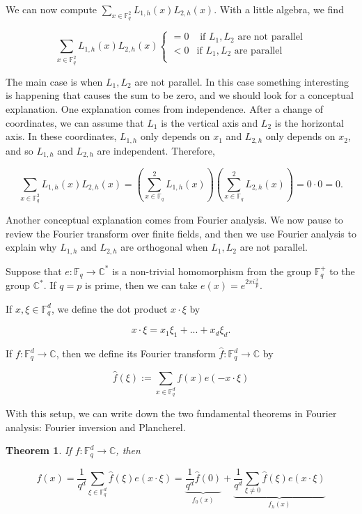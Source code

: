 \documentclass[12pt]{amsart}
\newtheorem{theorem}{Theorem}[section]
\newcommand{\FF}{\mathbb{F}}
\newcommand{\CC}{\mathbb{C}}
\begin{document}
We can now compute $\sum_{x \in \FF_q^2} L_{1,h}(x) L_{2,h}(x)$.  With a little algebra, we find

$$\sum_{x \in \FF_q^2} L_{1,h}(x) L_{2,h}(x) \begin{cases} =0 & \textrm{ if $L_1, L_2$ are not parallel} \\ < 0 & \textrm{if $L_1, L_2$ are parallel}  \\
    \end{cases}
$$

The main case is when $L_1, L_2$ are not parallel.  In this case something interesting is happening that causes the sum to be zero, and we should look for a conceptual explanation.  One explanation comes from independence.  After a change of coordinates, we can assume that $L_1$ is the vertical axis and $L_2$ is the horizontal axis.  In these coordinates, $L_{1,h}$ only depends on $x_1$ and $L_{2,h}$ only depends on $x_2$, and so $L_{1,h}$ and $L_{2,h}$ are independent.  Therefore,

$$ \sum_{x \in \FF_q^2} L_{1,h}(x) L_{2,h}(x) = \left(  \sum_{x \in \FF_q}^2 L_{1,h}(x)\right) \left(  \sum_{x \in \FF_q}^2 L_{2,h}(x)\right) = 0 \cdot 0 = 0.  $$

Another conceptual explanation comes from Fourier analysis.  We now pause to review the Fourier transform over finite fields, and then we use Fourier analysis to explain why $L_{1,h}$ and $L_{2,h}$ are orthogonal when $L_1, L_2$ are not parallel.

Suppose that $e: \FF_q \rightarrow \CC^*$ is a non-trivial homomorphism from the group $\FF_q^+$ to the group $\CC^*$.  If $q = p$ is prime, then we can take $e(x) = e^{2 \pi i \frac{x}{p}}$.

If $x, \xi \in \FF_q^d$, we define the dot product $x \cdot \xi$ by

$$ x \cdot \xi = x_1 \xi_1 + ... + x_d \xi_d.$$

If $f: \FF_q^d \rightarrow \CC$, then we define its Fourier transform $\hat f: \FF_q^d \rightarrow \CC$ by

\begin{equation}
    \hat f(\xi) := \sum_{x \in \FF_q^d} f(x) e(- x \cdot \xi)
\end{equation}

With this setup, we can write down the two fundamental theorems in Fourier analysis: Fourier inversion and Plancherel.

\begin{theorem} \label{fourinv} If $f: \FF_q^d \rightarrow \CC$, then

$$ f(x) = \frac{1}{q^d} \sum_{\xi \in \FF_q^d} \hat f(\xi) e(x \cdot \xi) = \underbrace{\frac{1}{q^d} \hat f(0)}_{f_0(x)} +  \underbrace{\frac{1}{q^d} \sum_{\xi \not= 0} \hat f(\xi) e(x \cdot \xi)}_{f_h(x)}$$
\end{theorem}
\end{document}
